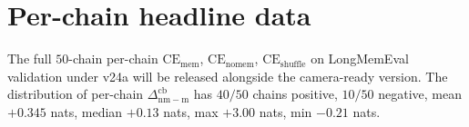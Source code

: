 \documentclass[11pt]{article}
\newcommand{\dnm}{\Delta_{\mathrm{nm{-}m}}}
\newcommand{\CEmem}{\mathrm{CE}_{\mathrm{mem}}}
\newcommand{\CEnomem}{\mathrm{CE}_{\mathrm{nomem}}}
\newcommand{\CEsh}{\mathrm{CE}_{\mathrm{shuffle}}}
\begin{document}
\section{Per-chain headline data}
\label{app:per_chain}

The full $50$-chain per-chain $\CEmem$, $\CEnomem$, $\CEsh$ on
LongMemEval validation under v24a will be released alongside the
camera-ready version. The distribution of per-chain
$\dnm^{\mathrm{cb}}$ has $40/50$ chains positive, $10/50$ negative,
mean $+0.345$ nats, median $+0.13$ nats, max $+3.00$ nats,
min $-0.21$ nats.
\end{document}
